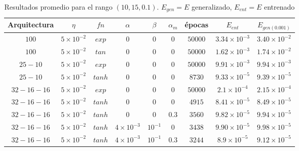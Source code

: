 \documentclass[12pt,a4paper]{article}
\begin{document}
\begin{table}[H]
\centering
\hspace*{-1.5cm}
\begin{tabular}{|c|c|c|c|c|c|c|c|c|}
  \hline
  Arquitectura & $\eta$ & $fn$ & $\alpha$ & $\beta$ & $\alpha_{m}$ & épocas & $E_{ent}$ & $E_{gen(0.001)}$  \\
  \hline
  $100$ & $5\times 10^{-2}$ & $exp$ & $0$ & $0$ & $0$ & $50000$ & $3.34 \times 10^{-3}$ & $3.40 \times 10^{-2}$\\
  \hline
  $100$ & $5\times 10^{-2}$ & $tan$ & $0$ & $0$ & $0$ & $50000$ & $1.62 \times 10^{-3}$ & $1.74 \times 10^{-2}$\\
  \hline
  $25-10$ & $5\times 10^{-2}$ & $exp$ & $0$ & $0$ & $0$ & $50000$ & $9.91 \times 10^{-3}$ & $9.94 \times 10^{-3}$\\
  \hline
   $25-10$ & $5\times 10^{-2}$ & $tanh$ & $0$ & $0$ & $0$ & $8730$ & $9.33 \times 10^{-5}$ & $9.39 \times 10^{-5}$\\
  \hline
   $32-16-16$ & $5\times 10^{-2}$ & $exp$ & $0$ & $0$ & $0$ & $50000$ & $2.1 \times 10^{-4}$ & $2.15 \times 10^{-4}$\\
  \hline
   $32-16-16$ & $5\times 10^{-2}$ & $tanh$ & $0$ & $0$ & $0$ & $4915$ & $8.41 \times 10^{-5}$ & $8.49 \times 10^{-5}$\\
  \hline
  $32-16-16$ & $5\times 10^{-2}$ & $tanh$ & $0$ & $0$ & $0.3$ & $3560$ & $9.82 \times 10^{-5}$ & $9.94 \times 10^{-5}$\\
  \hline
  $32-16-16$ & $5\times 10^{-2}$ & $tanh$ & $4 \times 10^{-3}$ & $10^{-1}$ & $0$ & $3438$ & $9.90 \times 10^{-5}$ & $9.98 \times 10^{-5}$\\
  \hline
  $32-16-16$ & $5\times 10^{-2}$ & $tanh$ & $4 \times 10^{-3}$ & $10^{-1}$ & $0.3$ & $3244$ & $8.9 \times 10^{-5}$ & $9.12 \times 10^{-5}$\\
  \hline
\end{tabular}
\caption{Resultados promedio para el rango $(10,15,0.1)$. $E_{gen} = E$ generalizado, $E_{ent} = E $ entrenado}
\end{table}
\hspace*{-1.5cm}
\end{document}

